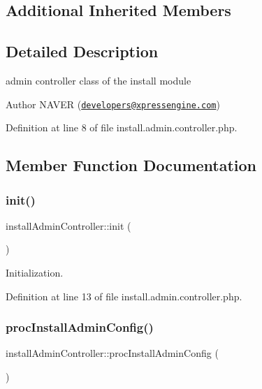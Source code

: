 \subsection*{Additional Inherited Members}


\subsection{Detailed Description}
admin controller class of the install module 

\begin{DoxyAuthor}{Author}
N\+A\+V\+ER (\href{mailto:developers@xpressengine.com}{\tt developers@xpressengine.\+com}) 
\end{DoxyAuthor}


Definition at line 8 of file install.\+admin.\+controller.\+php.



\subsection{Member Function Documentation}
\mbox{\label{classinstallAdminController_a3eda4638a74c9a92eba2803c1beff6a3}} 
\subsubsection{\texorpdfstring{init()}{init()}}
{\footnotesize\ttfamily install\+Admin\+Controller\+::init (\begin{DoxyParamCaption}{ }\end{DoxyParamCaption})}



Initialization. 



Definition at line 13 of file install.\+admin.\+controller.\+php.

\mbox{\label{classinstallAdminController_a57d9a607291587b656246beca9fd51fe}} 
\subsubsection{\texorpdfstring{proc\+Install\+Admin\+Config()}{procInstallAdminConfig()}}
{\footnotesize\ttfamily install\+Admin\+Controller\+::proc\+Install\+Admin\+Config (\begin{DoxyParamCaption}{ }\end{DoxyParamCaption})}




